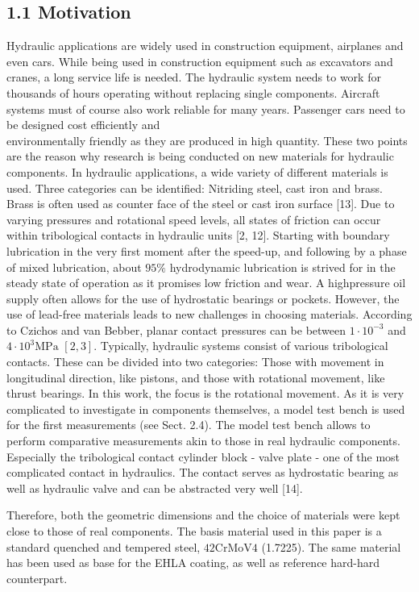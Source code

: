 \documentclass[10pt]{article}
\begin{document}
\subsection*{1.1 Motivation}
Hydraulic applications are widely used in construction equipment, airplanes and even cars. While being used in construction equipment such as excavators and cranes, a long service life is needed. The hydraulic system needs to work for thousands of hours operating without replacing single components. Aircraft systems must of course also work reliable for many years. Passenger cars need to be designed cost efficiently and\\
environmentally friendly as they are produced in high quantity. These two points are the reason why research is being conducted on new materials for hydraulic components. In hydraulic applications, a wide variety of different materials is used. Three categories can be identified: Nitriding steel, cast iron and brass. Brass is often used as counter face of the steel or cast iron surface [13]. Due to varying pressures and rotational speed levels, all states of friction can occur within tribological contacts in hydraulic units [2, 12]. Starting with boundary lubrication in the very first moment after the speed-up, and following by a phase of mixed lubrication, about $95 \%$ hydrodynamic lubrication is strived for in the steady state of operation as it promises low friction and wear. A highpressure oil supply often allows for the use of hydrostatic bearings or pockets. However, the use of lead-free materials leads to new challenges in choosing materials. According to Czichos and van Bebber, planar contact pressures can be between $1 \cdot 10^{-3}$ and $4 \cdot 10^{3} \mathrm{MPa}$ $[2,3]$. Typically, hydraulic systems consist of various tribological contacts. These can be divided into two categories: Those with movement in longitudinal direction, like pistons, and those with rotational movement, like thrust bearings. In this work, the focus is the rotational movement. As it is very complicated to investigate in components themselves, a model test bench is used for the first measurements (see Sect. 2.4). The model test bench allows to perform comparative measurements akin to those in real hydraulic components. Especially the tribological contact cylinder block - valve plate - one of the most complicated contact in hydraulics. The contact serves as hydrostatic bearing as well as hydraulic valve and can be abstracted very well [14].

Therefore, both the geometric dimensions and the choice of materials were kept close to those of real components. The basis material used in this paper is a standard quenched and tempered steel, $42 \mathrm{CrMoV} 4$ (1.7225). The same material has been used as base for the EHLA coating, as well as reference hard-hard counterpart.
\end{document}

